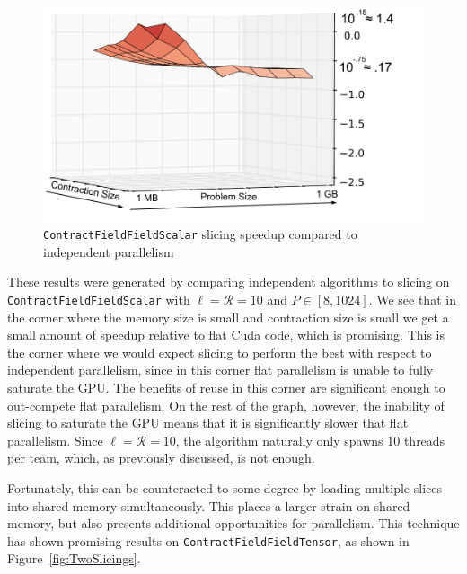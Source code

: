 \begin{figure}[!ht] 
    \centering
    \includegraphics[width=5in]{CFFS_Slicing}
    \caption[\texttt{ContractFieldFieldScalar} speedup over
    flat parallel]{\texttt{ContractFieldFieldScalar} slicing speedup compared to
    independent parallelism}
\label{fig:CFFSSlicingVSIndepentent}
\end{figure}


These results were generated by comparing independent algorithms to slicing on
\texttt{ContractFieldFieldScalar} with $\ell = \mathcal{R} = 10$ and $P \in [8,1024]$. We see
that in the corner where the memory size is small and contraction size is small
we get a small amount of speedup relative to flat Cuda code, which is
promising. This is the corner where we would expect slicing to perform the best
with respect to independent parallelism, since in this corner flat parallelism
is unable to fully saturate the GPU. The benefits of reuse in this corner are
significant enough to out-compete flat parallelism. On the rest of the graph,
however, the inability of slicing to saturate the GPU means that it is
significantly slower that flat parallelism. Since $\ell = \mathcal{R} = 10$,
the algorithm naturally only spawns 10 threads per team, which, as previously discussed, is not enough. 

Fortunately, this can be counteracted to some degree by loading multiple slices 
into shared memory simultaneously. This places a larger strain on shared memory, 
but also presents additional opportunities for parallelism. 
This technique has shown promising results on \texttt{ContractFieldFieldTensor}, as shown in Figure~\ref{fig:TwoSlicings}. 

